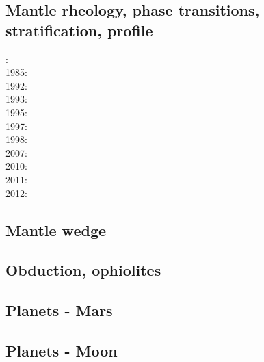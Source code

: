 \subsection*{Mantle rheology, phase transitions, stratification, profile}

: \cite{yusb82}\cite{chri82}\\
1985: \cite{chyu85}\\
1992: \cite{zhyh92}\\
1993: \cite{tasg93}\\
1995: \cite{zhyu95}\\
1997: \cite{mifo97}\\
1998: \cite{cava98}\\
2007: \cite{pazw07}\\
2010: \cite{kayy10}\\
2011: \cite{java11}\\
2012: \cite{tack12}

\subsection*{Mantle wedge}

\noindent
\cite{tosl78}
\cite{bigu01}
\cite{knva08}
\cite{leki09}
\cite{roms10}
\cite{ledg14}

\subsection*{Obduction, ophiolites}

\noindent
\cite{hack90}
\cite{hack91}
\cite{agzf14}

\subsection*{Planets - Mars}

\cite{scbg90}
\cite{nist01}
\cite{vavv05}
\cite{seki14}
\cite{zhon16}

\subsection*{Planets - Moon}

\cite{zhdv19}

